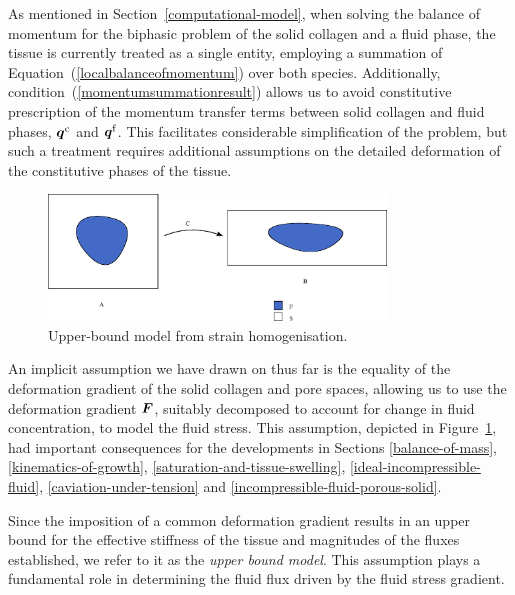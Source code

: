 As mentioned in Section~\ref{computational-model}, when solving the balance of momentum
for the biphasic problem of the solid collagen and a fluid phase, the
tissue is currently treated as a single entity, employing a summation
of Equation~(\ref{localbalanceofmomentum}) over both species. Additionally,
condition~(\ref{momentumsummationresult}) allows us to avoid constitutive
prescription of the momentum transfer terms between solid collagen and
fluid phases,
$\mbox{\boldmath$ q$}^\mathrm{c}$ and $\mbox{\boldmath$ q$}^\mathrm{f}$. This facilitates considerable
simplification of the 
problem, but such a treatment requires additional assumptions on the
detailed deformation of the constitutive phases of the tissue.

\begin{figure}[!hpt]
  \centering
  \includegraphics[width=0.8\textwidth]{images/elucidation/homogeneous-deformation}
  \caption{Upper-bound model from strain homogenisation.}
  \label{upper-bound-model}
\end{figure}

An implicit assumption we have drawn on thus far is the equality of
the deformation gradient of the solid collagen and pore spaces,
allowing us to use the deformation gradient $\mbox{\boldmath$ F$}$, suitably decomposed
to account for change in fluid concentration, to model the fluid
stress. This assumption, depicted in Figure~\ref{upper-bound-model},
had important consequences for the developments in Sections
\ref{balance-of-mass}, \ref{kinematics-of-growth},
\ref{saturation-and-tissue-swelling}, \ref{ideal-incompressible-fluid},
\ref{caviation-under-tension} and \ref{incompressible-fluid-porous-solid}.

Since the imposition of a common deformation gradient results in an
upper bound for the effective stiffness of the tissue and magnitudes
of the fluxes established, we refer to it as the {\em upper bound
  model}. This assumption plays a fundamental role in determining the
fluid flux driven by the fluid stress gradient.


